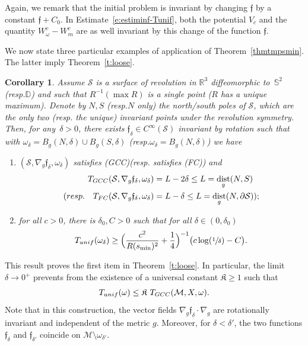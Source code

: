 \documentclass[11pt]{article}
\newcommand{\resp}{resp.\xspace}
\numberwithin{equation}{section}
\newcommand{\FC}{\textup{FC}}
\newcommand{\pFC}{\textup{(FC)}\xspace}
\newcommand{\GCC}{\textup{GCC}}
\newcommand{\pGCC}{\textup{(GCC)}\xspace}
\newcommand{\unif}{\textup{unif}}
\newtheorem{corollary}[lemma]{Corollary}
\theoremstyle{definition}
\newcommand{\M}{\ensuremath{\mathcal M}}
\newcommand{\calS}{\ensuremath{\mathcal S}}
\newcommand{\mb}[1]{\ensuremath{\mathbb{#1}}}
\newcommand{\ID}{\ensuremath{\mathbb D}}
\newcommand{\R}{{\mb{R}}}
\newcommand{\bS}{\ensuremath{\mathbb S}}
\newcommand{\f}{\ensuremath{\mathfrak{f}}}
\DeclareMathOperator{\dist}{dist}
\newcommand{\ce}{c}
\let\d\partial
\let\de\delta
\begin{document}
Again, we remark that the initial problem is invariant by changing $\f$ by a constant $\f+C_0$. In Estimate~\eqref{e:estiminf-Tunif}, both the potential $V_{c}$ and the quantity $W_{\omega}^{\ce}-W_{m}^{\ce}$ are as well invariant by this change of the function $\f$.

We now state three particular examples of application of Theorem~\ref{thmtmpsmin}.
The latter imply Theorem~\ref{t:loose}.

\begin{corollary}
\label{c:sphere-disk}
Assume $\calS$ is a surface of revolution in $\R^3$ diffeomorphic to~$\bS^2$ (\resp $\ID$) and such that $R^{-1}(\max R)$ is a single point ($R$ has a unique maximum). Denote by $N,S$ (\resp $N$ only) the north/south poles of $\calS$, which are the only two (\resp the unique) invariant points under the revolution symmetry.
Then, for any~\hbox{$\delta>0$}, there exists $\f_\delta \in C^\infty(\calS)$ invariant by rotation such that
with $\omega_\delta = B_g(N, \delta) \cup B_g(S, \delta)$ (\resp $\omega_\delta = B_g(N, \delta)$) we have
\begin{enumerate}
\item $(\calS,\nabla_g\f_\de,\omega_\delta)$ satisfies \pGCC (\resp satisfies \pFC) and\vspace*{-3pt}
\begin{align*}
T_{\GCC}(\calS,\nabla_g\f_\de,\omega_\delta) &= L-2\delta \leq L= \dist_g(N,S)\\
(\resp \quad T_{\FC}(\calS,\nabla_g\f_\de,\omega_\delta) &= L-\delta \leq L= \dist_g(N,\d\calS));
\end{align*}
\item for all $\ce>0$, there is $\delta_0,C >0$ such that for all $\delta \in (0,\delta_0)$\vspace*{-3pt}
\[
T_{\unif}(\omega_\delta) \geq \Bigl( \frac{\ce^2}{R(s_{\min})^2} + \frac14 \Bigr)^{-1} \bigl( \ce \log(\sfrac1{\delta}) - C \bigr).
\]
\end{enumerate}
\end{corollary}
This result proves the first item in Theorem~\ref{t:loose}.
In particular, the limit \hbox{$\delta\to 0^+$} prevents from the existence of a universal constant $\mathfrak{K}\geq 1$ such that\vspace*{-3pt}
\[
T_{\unif}(\omega) \leq \mathfrak{K} \ T_{\GCC}(\M,X,\omega).
\]
Note that in this construction, the vector fields $\nabla_g\f_\de \cdot \nabla_g$ are rotationally invariant and independent of the metric $g$. Moreover, for $\delta < \delta'$, the two functions $\f_\de$ and $\f_{\de'}$ coincide on $\M\setminus \omega_{\delta'}$.
\end{document}
